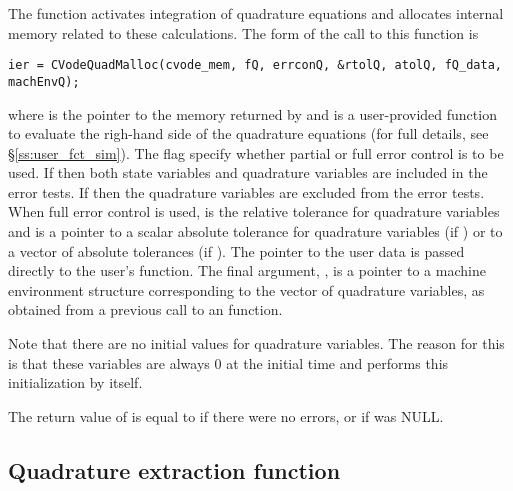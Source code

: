 The function  activates integration of quadrature equations 
and allocates internal memory related to these calculations.
The form of the call to this function is
\begin{verbatim}
ier = CVodeQuadMalloc(cvode_mem, fQ, errconQ, &rtolQ, atolQ, fQ_data, machEnvQ);  
\end{verbatim}
where  is the pointer to the {\cvodes} memory returned by 
and  is a user-provided {\C} function to evaluate the righ-hand side of the
quadrature equations (for full details, see \S\ref{ss:user_fct_sim}). 
The flag  specify whether partial or full error 
control is to be used. If  then both state variables and
quadrature variables are included in the error tests. 
If  then the quadrature variables are excluded from the 
error tests. When full error control is used,  is the relative tolerance for
quadrature variables and  is a pointer to a scalar absolute tolerance for
quadrature variables (if ) or to a vector of absolute tolerances 
(if ). The pointer to the user data  is passed
directly to the user's  function. The final argument, ,
is a pointer to a machine environment structure corresponding to the
vector of quadrature variables, as obtained from a previous call to an
 function.

Note that there are no initial values for quadrature variables. The reason for this is 
that these variables are always $0$ at the initial time and {\cvodes} performs this
initialization by itself.

The return value  of  is equal to  if
there were no errors, or  if  was NULL.  


\subsection{Quadrature extraction function}\label{sss:cvodequadextract}

